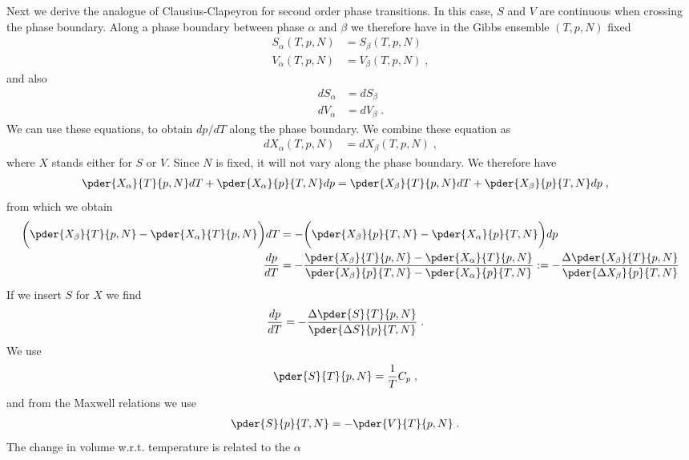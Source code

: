 Next we derive the analogue of Clausius-Clapeyron for second order phase transitions.
In this case, $S$ and $V$ are continuous when crossing 
the phase boundary. Along a phase boundary between phase $\alpha$ and $\beta$ we therefore have in the Gibbs ensemble $(T,p,N)$ fixed
%
\begin{align*}
S_{\alpha}(T,p,N) &= S_{\beta}(T,p,N)\\
V_{\alpha}(T,p,N) &= V_{\beta}(T,p,N)\;,
\end{align*}
%
and also
%
\begin{align*}
dS_{\alpha} &= dS_{\beta}\\
dV_{\alpha} &= dV_{\beta}\;.
\end{align*}
%
We can use these equations, to obtain $dp/dT$ along the phase boundary.
We combine  these equation as
%
\begin{align*}
dX_{\alpha}(T,p,N) &= dX_{\beta}(T,p,N)\;,
\end{align*}
%
where $X$ stands either for $S$ or $V$.
Since $N$ is fixed, it will not vary along the phase boundary. We therefore have
\begin{align*}
\pder{X_{\alpha}}{T}{p,N} dT +\pder{X_{\alpha}}{p}{T,N} dp
&=\pder{X_{\beta}}{T}{p,N} dT +\pder{X_{\beta}}{p}{T,N} dp\;,
\end{align*}
%
from which we obtain
%
\begin{align*}
\bigg(\pder{X_{\beta}}{T}{p,N}-\pder{X_{\alpha}}{T}{p,N}\bigg)dT
&=
-\bigg(\pder{X_{\beta}}{p}{T,N}-\pder{X_{\alpha}}{p}{T,N}\bigg)dp\\
\frac{dp}{dT}
&=
-\frac{\pder{X_{\beta}}{T}{p,N}-\pder{X_{\alpha}}{T}{p,N}}
{\pder{X_{\beta}}{p}{T,N}-\pder{X_{\alpha}}{p}{T,N}}
:=
-\frac{\Delta \pder{X_{\beta}}{T}{p,N}}
{\pder{\Delta X_{\beta}}{p}{T,N}}
\end{align*}
%
If we insert $S$ for $X$ we find
%
\begin{align}\label{eq:}
\frac{d p}{dT} &=-\frac{\Delta \pder{S}{T}{p,N}}
{\pder{\Delta S}{p}{T,N}}\;.
\end{align}
%
We use 
%
\begin{align*}
\pder{S}{T}{p,N} &= \frac{1}{T} C_{p}\;,
\end{align*}
%
and from the Maxwell relations we use 
%
\begin{align*}
\pder{S}{p}{T,N} &= -\pder{V}{T}{p,N} \;.
\end{align*}
%
The change in volume w.r.t. temperature is related to the 
$\alpha$
%
